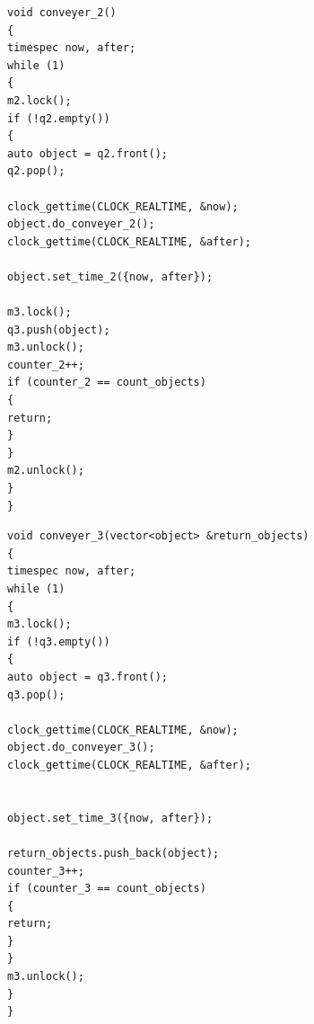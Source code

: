 \documentclass[a4paper,12pt]{article}
\begin{document}
\begin{lstlisting}[label=lst3,caption=Лента 2]
void conveyer_2()
{
timespec now, after;
while (1)
{
m2.lock();
if (!q2.empty())
{
auto object = q2.front();
q2.pop();

clock_gettime(CLOCK_REALTIME, &now);
object.do_conveyer_2();
clock_gettime(CLOCK_REALTIME, &after);

object.set_time_2({now, after});

m3.lock();
q3.push(object);
m3.unlock();
counter_2++;
if (counter_2 == count_objects)
{
return;
}
}
m2.unlock();
}
}
\end{lstlisting}

\begin{lstlisting}[label=lst4,caption=Лента 3]
void conveyer_3(vector<object> &return_objects)
{
timespec now, after;
while (1)
{
m3.lock();
if (!q3.empty())
{
auto object = q3.front();
q3.pop();

clock_gettime(CLOCK_REALTIME, &now);
object.do_conveyer_3();
clock_gettime(CLOCK_REALTIME, &after);


object.set_time_3({now, after});

return_objects.push_back(object);
counter_3++;
if (counter_3 == count_objects)
{
return;
}
}
m3.unlock();
}
}
\end{lstlisting}
\end{document}
